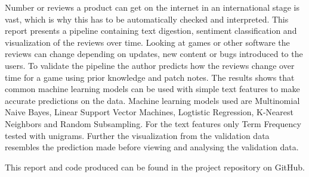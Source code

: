 Number or reviews a product can get on the internet in an international stage is vast, which is why this has to be automatically checked and interpreted. 
This report presents a pipeline containing text digestion, sentiment classification and visualization of the reviews over time. 
Looking at games or other software the reviews can change depending on updates, new content or bugs introduced to the users. 
To validate the pipeline the author predicts how the reviews change over time for a game using prior knowledge and patch notes. 
The results shows that common machine learning models can be used with simple text features to make accurate predictions on the data. 
Machine learning models used are Multinomial Naive Bayes, Linear Support Vector Machines, Logtistic Regression, K-Nearest Neighbors and Random Subsampling. 
For the text features only Term Frequency tested with unigrams. 
Further the visualization from the validation data resembles the prediction made before viewing and analysing the validation data. 


This report and code produced can be found in the project repository on GitHub.